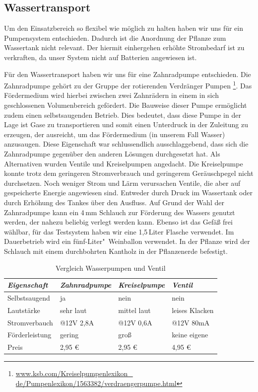 \subsection{Wassertransport}
Um den Einsatzbereich so flexibel wie möglich zu halten haben wir uns für ein Pumpensystem entschieden. 
Dadurch ist die Anordnung der Pflanze zum Wassertank nicht relevant. 
Der hiermit einhergehen erhöhte Strombedarf ist zu verkraften, da unser System nicht auf Batterien angewiesen ist.

Für den Wassertransport haben wir uns für eine Zahnradpumpe entschieden.
Die Zahnradpumpe gehört zu der Gruppe der rotierenden Verdränger Pumpen 
\footnote{\href{http://www.ksb.com/Kreiselpumpenlexikon\_de/Pumpenlexikon/1563382/verdraengerpumpe.html}{www.ksb.com/Kreiselpumpenlexikon\_ \\ de/Pumpenlexikon/1563382/verdraengerpumpe.html}}.
Das Fördermedium wird hierbei zwischen zwei Zahnrädern in einem in sich geschlossenen Volumenbereich gefördert.
Die Bauweise dieser Pumpe ermöglicht zudem einen selbstsaugenden Betrieb. 
Dies bedeutet, dass diese Pumpe in der Lage ist Gase zu transportieren und somit einen Unterdruck in der Zuleitung zu erzeugen, der ausreicht, um das Fördermedium (in unserem Fall Wasser) anzusaugen. 
Diese Eigenschaft war schlussendlich ausschlaggebend, dass sich die Zahnradpumpe gegenüber den anderen Lösungen durchgesetzt hat.
Als Alternativen wurden Ventile und Kreiselpumpen angedacht.
Die Kreiselpumpe konnte trotz dem geringeren Stromverbrauch und geringerem Geräuschpegel nicht durchsetzen. 
Noch weniger Strom und Lärm verursachen Ventile, die aber auf gespeicherte Energie angewiesen sind.  
Entweder durch Druck im Wassertank oder durch Erhöhung des Tankes über den Ausfluss. 
Auf Grund der Wahl der Zahnradpumpe kann ein 4\,mm Schlauch zur Förderung des Wassers genutzt werden, der nahezu beliebig verlegt werden kann.  
Ebenso ist das Gefäß frei wählbar, für das Testsystem haben wir eine 1,5\,Liter Flasche verwendet. Im Dauerbetrieb wird ein fünf-Liter"~Weinballon verwendet. 
In der Pflanze wird der Schlauch mit einem durchbohrten Kantholz in der Pflanzenerde befestigt.

	
\begin{table}
	\centering
		\onehalfspacing
	\footnotesize
	\caption{Vergleich Wasserpumpen und Ventil}
	\label{Vergleich zwischen Wasserpumpen und Ventil}
		\begin{tabular}{|l|lll|}
		\hline
		\textit{Eigenschaft} & \textit{Zahnradpumpe} & \textit{Kreiselpumpe} & \textit{Ventil} \\
		\hline
		Selbstsaugend	&ja	&nein &nein\\		
		Lautstärke		&sehr laut	&mittel laut	&leises Klacken\\
		Stromverbauch	&@12V 2,8A	&@12V 0,6A	&@12V 80mA\\
		Förderleistung	&gering		&groß		&keine eigene\\
		Preis			&2,95 \euro	& 2,95 \euro	&	4,95 \euro\\
		\hline		
		\end{tabular}
		
\end{table}	
	
